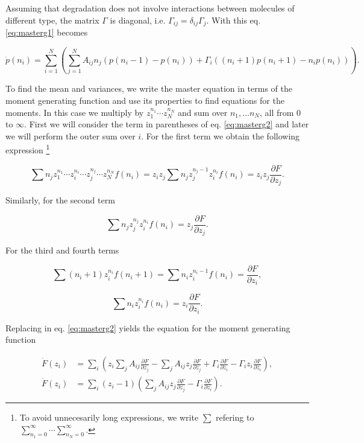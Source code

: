 Assuming that degradation does not involve interactions between molecules of different type, the matrix $\Gamma$ is diagonal, i.e. $\Gamma_{ij}=\delta_{ij}\Gamma_j$. With this eq. \eqref{eq:masterg1} becomes

\begin{equation}
\label{eq:masterg2}
\dot{p}(n_i) =  \sum_{i=1}^N\left(\sum_{j=1}^N A_{ij}n_j \left( p(n_i-1) - p(n_i) \right) + \Gamma_{i}((n_i+1)p(n_i+1)-n_ip(n_i))\right).
\end{equation}

To find the mean and variances, we write the master equation in terms of the moment generating function and use its properties to find equations for the moments. In this case we multiply by $z_1^{n_1}\dotsm z_N^{n_N}$ and sum over $n_1,\dotsc n_N$, all from $0$ to $\infty$. First we will consider the term in parentheses of eq. \eqref{eq:masterg2} and later we will perform the outer sum over $i$. For the first term we obtain the following expression \footnote{To avoid unnecesarily long expressions, we write $\sum$ refering to $\sum_{n_1=0}^\infty\dotsi\sum_{n_N=0}^\infty$.}

\begin{equation*}
  \sum n_j z_1^{n_1}\dotsm z_i^{n_i}\dotsm z_j^{n_j}\dotsm z_N^{n_N} f(n_i) = z_iz_j\sum n_jz_j^{n_j-1}z_i^{n_i}f(n_i) = z_iz_j\frac{\partial F}{\partial z_j}. 
\end{equation*} 

Similarly, for the second term

\begin{equation*}
  \sum n_jz_j^{n_j}z_i^{n_i}f(n_i) = z_j\frac{\partial F}{\partial z_j}.
\end{equation*}

For the third and fourth terms

\begin{equation*}
  \sum (n_i+1)z_i^{n_i}f(n_i+1) = \sum n_i z_i^{n_i-1}f(n_i) = \frac{\partial F}{\partial z_i},
\end{equation*}

\begin{equation*}
  \sum n_iz_i^{n_i}f(n_i) = z_i\frac{\partial F}{\partial z_i}.
\end{equation*}

Replacing in eq. \eqref{eq:masterg2} yields the equation for the moment generating function

\begin{equation*}
  \begin{split}
    \dot{F}(z_i) &= \sum_i\left( z_i\sum_jA_{ij}\frac{\partial F}{\partial z_j} - \sum_jA_{ij} z_j \frac{\partial F}{\partial z_j} + \Gamma_i\frac{\partial F}{\partial z_i} - \Gamma_iz_i\frac{\partial F}{\partial z_i}\right),\\
    \dot{F}(z_i) &= \sum_i(z_i-1)\left(\sum_jA_{ij} z_j \frac{\partial F}{\partial z_j} - \Gamma_i\frac{\partial F}{\partial z_i}\right).
  \end{split}
\end{equation*}

